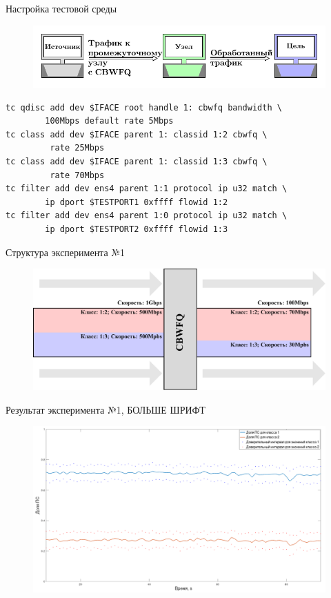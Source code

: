 \documentclass[12pt]{beamer}
\begin{document}
\begin{frame}[fragile]{Настройка тестовой среды}
	\begin{figure}
		\center
    	\includegraphics[scale=0.8]{../text/pdfimages/test_scheme.pdf}
	\end{figure}
{\footnotesize
	\begin{lstlisting}[frame=single]
tc qdisc add dev $IFACE root handle 1: cbwfq bandwidth \
		100Mbps default rate 5Mbps
tc class add dev $IFACE parent 1: classid 1:2 cbwfq \
		 rate 25Mbps
tc class add dev $IFACE parent 1: classid 1:3 cbwfq \
		 rate 70Mbps
tc filter add dev ens4 parent 1:1 protocol ip u32 match \
        ip dport $TESTPORT1 0xffff flowid 1:2
tc filter add dev ens4 parent 1:0 protocol ip u32 match \
        ip dport $TESTPORT2 0xffff flowid 1:3
    \end{lstlisting}
}
\end{frame}

\begin{frame}{Структура эксперимента №1}
	\begin{figure}
		\center
    	\includegraphics[scale=0.6]{../text/pdfimages/exp_scheme.pdf}
	\end{figure}
\end{frame}

\begin{frame}{Результат эксперимента №1, БОЛЬШЕ ШРИФТ}
	\begin{figure}
		\center
    	\includegraphics[scale=0.3]{../text/plotc.png}
	\end{figure}
\end{frame}
\end{document}
